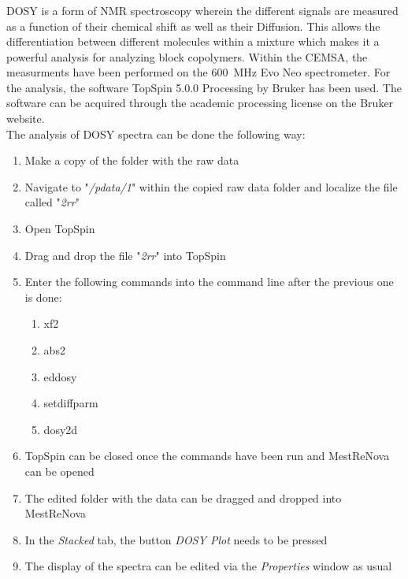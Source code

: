 \documentclass[11pt]{scrreport}
\let\cite=\supercite
\begin{document}
	\subsubsection{}
	\Gls{DOSY} is a form of \gls{NMR} spectroscopy wherein the different signals are measured as a function of their chemical shift as well as their \gls{Diffusion}. This allows the differentiation between different molecules within a mixture which makes it a powerful analysis for analyzing block copolymers. Within the \gls{CEMSA}, the measurments have been performed on the \SI{600}{\mega\hertz} Evo Neo spectrometer. For the analysis, the software TopSpin 5.0.0 Processing by Bruker has been used. The software can be acquired through the academic processing license on the Bruker website.\cite{noauthor_topspin_nodate}\\
	The analysis of \gls{DOSY} spectra can be done the following way:
	\begin{enumerate}
		\item Make a copy of the folder with the raw data
		\item Navigate to "\textit{/pdata/1}" within the copied raw data folder and localize the file called "\textit{2rr}"
		\item Open TopSpin
		\item Drag and drop the file "\textit{2rr}" into TopSpin
		\item Enter the following commands into the command line after the previous one is done:
		\begin{enumerate}
			\item xf2
			\item abs2
			\item eddosy
			\item setdiffparm
			\item dosy2d
		\end{enumerate}
		\item TopSpin can be closed once the commands have been run and MestReNova can be opened
		\item The edited folder with the data can be dragged and dropped into MestReNova
		\item In the \textit{Stacked} tab, the button \textit{DOSY Plot} needs to be pressed
		\item The display of the spectra can be edited via the \textit{Properties} window as usual
	\end{enumerate}\newpage
\end{document}
